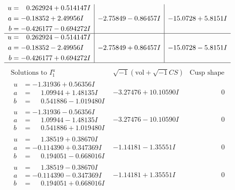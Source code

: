 \documentclass[1p]{elsarticle_modified}
\theoremstyle{definition}
\newcommand{\I}{\sqrt{-1}}
\begin{document}
$$\begin{array}{c|c|c}
\begin{aligned}
u &= \phantom{-}0.262924 + 0.514147 I \\
a &= -0.18352 + 2.49956 I \\
b &= -0.426177 - 0.694272 I\end{aligned}
 & -2.75849 - 0.86457 I & -15.0728 + 5.8151 I \\ \hline\begin{aligned}
u &= \phantom{-}0.262924 - 0.514147 I \\
a &= -0.18352 - 2.49956 I \\
b &= -0.426177 + 0.694272 I\end{aligned}
 & -2.75849 + 0.86457 I & -15.0728 - 5.8151 I\\
 \hline 
 \end{array}$$\newpage$$\begin{array}{c|c|c}  
\text{Solutions to }I^u_{1}& \I (\text{vol} + \sqrt{-1}CS) & \text{Cusp shape}\\
 \hline 
\begin{aligned}
u &= -1.31936 + 0.56356 I \\
a &= \phantom{-}1.09944 + 1.48135 I \\
b &= \phantom{-}0.541886 - 1.019480 I\end{aligned}
 & -3.27476 + 10.10590 I & \phantom{-0.000000 } 0 \\ \hline\begin{aligned}
u &= -1.31936 - 0.56356 I \\
a &= \phantom{-}1.09944 - 1.48135 I \\
b &= \phantom{-}0.541886 + 1.019480 I\end{aligned}
 & -3.27476 - 10.10590 I & \phantom{-0.000000 } 0 \\ \hline\begin{aligned}
u &= \phantom{-}1.38519 + 0.38670 I \\
a &= -0.114390 + 0.347369 I \\
b &= \phantom{-}0.194051 - 0.668016 I\end{aligned}
 & -1.14181 - 1.35551 I & \phantom{-0.000000 } 0 \\ \hline\begin{aligned}
u &= \phantom{-}1.38519 - 0.38670 I \\
a &= -0.114390 - 0.347369 I \\
b &= \phantom{-}0.194051 + 0.668016 I\end{aligned}
 & -1.14181 + 1.35551 I & \phantom{-0.000000 } 0 \\ \hline\begin{aligned}

\end{aligned}
\end{array}$$
\end{document}
